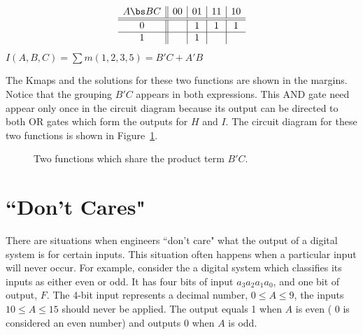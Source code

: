\begin{process:minimizationKmap}
{$$ \begin{array} {c||c|c|c|c}
        A \bs BC & 00 & 01 & 11 & 10 \\ \hline \hline
        0        &    & 1  & 1  & 1  \\ \hline
        1        &    & 1  &    &    \\
\end{array} $$
$I(A,B,C) = \sum m(1,2,3,5) = B'C + A'B$ 
}

The Kmaps and the solutions for these two functions are shown in 
the margins.  Notice that the grouping $B'C$ appears in both
\SOPmin expressions.  This AND gate need appear only once in the
circuit diagram because its output can be directed to both OR gates 
which form the outputs for $H$ and $I$.  The circuit diagram for 
these two functions is shown in Figure~\ref{fig:minimizationShare}.

\begin{figure}[ht]
\caption{Two functions which share the product term $B'C$.}
\label{fig:minimizationShare}
\end{figure}

\section{``Don't Cares"}
There are situations when engineers ``don't care" what the output of a
digital system is for certain inputs.  This situation often happens when 
a particular input will never occur.  For example, consider the 
a digital system which classifies its inputs as either even or
odd.  It has four bits of input $a_3 a_2 a_1 a_0$, and one bit 
of output, $F$.  The 4-bit input represents a decimal number, 
$0 \le A \le 9$, the inputs $10 \le A \le 15$ should never be
applied.  The output equals 1 when $A$ is even ( 0 is considered 
an even number) and outputs 0 when $A$ is odd.


\end{process:minimizationKmap}
